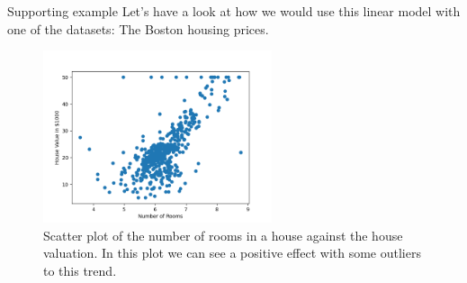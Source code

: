 \documentclass[10pt]{beamer}
\begin{document}
\begin{frame}[label={sec:orgd367f10}]{Supporting example}
Let's have a look at how we would use this linear model with one of the datasets: The
Boston housing prices.

\begin{figure}[htbp]
\centering
\includegraphics[width=0.6\textwidth]{images/boston_rooms_prices.png}
\caption{Scatter plot of the number of rooms in a house against the house valuation. In this plot we can see a positive effect with some outliers to this trend.}
\end{figure}
\end{frame}
\end{document}
